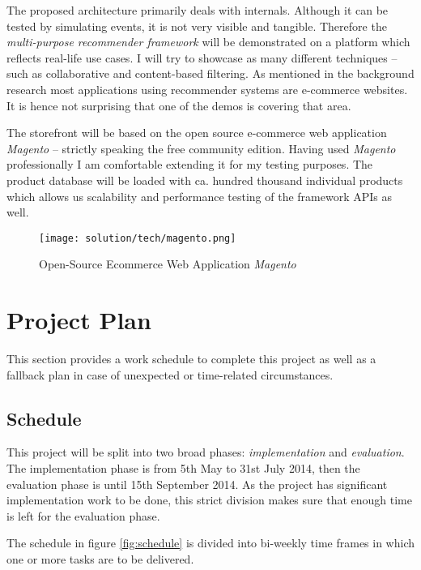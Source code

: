 The proposed architecture primarily deals with internals. Although it can be tested by simulating events, it is not very visible and tangible. Therefore the \emph{multi-purpose recommender framework} will be demonstrated on a platform which reflects real-life use cases. I will try to showcase as many different techniques -- such as collaborative and content-based filtering. As mentioned in the background research most applications using recommender systems are e-commerce websites. It is hence not surprising that one of the demos is covering that area.

The storefront will be based on the open source e-commerce web application \emph{Magento} -- strictly speaking the free community edition. Having used \emph{Magento} professionally I am comfortable extending it for my testing purposes. The product database will be loaded with ca. hundred thousand individual products which allows us scalability and performance testing of the framework APIs as well.

\begin{figure}[ht]
    \texttt{[image: solution/tech/magento.png]}
    \caption{Open-Source Ecommerce Web Application \emph{Magento}}
    \label{fig:magento}
\end{figure}



\section{Project Plan}

This section provides a work schedule to complete this project as well as a fallback plan in case of unexpected or time-related circumstances.

\subsection{Schedule}

This project will be split into two broad phases: \emph{implementation} and \emph{evaluation}. The implementation phase is from 5th May to 31st July 2014, then the evaluation phase is until 15th September 2014. As the project has significant implementation work to be done, this strict division makes sure that enough time is left for the evaluation phase.

The schedule in figure \ref{fig:schedule} is divided into bi-weekly time frames in which one or more tasks are to be delivered. 

